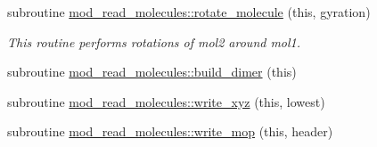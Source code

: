 \begin{DoxyCompactItemize}
subroutine \hyperlink{namespacemod__read__molecules_a3b4923002ba2fa7a6438df2afa80d406}{mod\+\_\+read\+\_\+molecules\+::rotate\+\_\+molecule} (this, gyration)
\begin{DoxyCompactList}\small\item\em This routine performs rotations of mol2 around mol1. \end{DoxyCompactList}\item 
subroutine \hyperlink{namespacemod__read__molecules_a2766cc4e8b825aea9e9695ee50fbd2f9}{mod\+\_\+read\+\_\+molecules\+::build\+\_\+dimer} (this)
\item 
subroutine \hyperlink{namespacemod__read__molecules_ab4af6b28d9b99eb519efb212a5f02f58}{mod\+\_\+read\+\_\+molecules\+::write\+\_\+xyz} (this, lowest)
\item 
subroutine \hyperlink{namespacemod__read__molecules_a79baec2daf0d11f0bd50d405874d4186}{mod\+\_\+read\+\_\+molecules\+::write\+\_\+mop} (this, header)
\end{DoxyCompactItemize}
